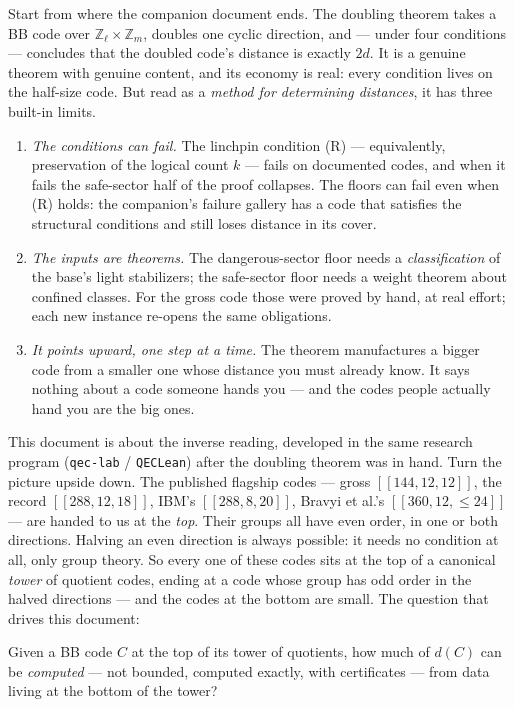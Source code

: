 \documentclass[11pt]{article}
\theoremstyle{plain}
\theoremstyle{definition}
\theoremstyle{remark}
\newcommand{\Z}{\mathbb{Z}}
\begin{document}
Start from where the companion document ends. The doubling theorem takes a
BB code over $\Z_\ell \times \Z_m$, doubles one cyclic direction, and ---
under four conditions --- concludes that the doubled code's distance is
exactly $2d$. It is a genuine theorem with genuine content, and its
economy is real: every condition lives on the half-size code. But read as
a \emph{method for determining distances}, it has three built-in limits.

\begin{enumerate}[leftmargin=2.2em]
\item \emph{The conditions can fail.} The linchpin condition (R) ---
  equivalently, preservation of the logical count $k$ --- fails on
  documented codes, and when it fails the safe-sector half of the proof
  collapses. The floors can fail even when (R) holds: the companion's
  failure gallery has a code that satisfies the structural conditions and
  still loses distance in its cover.
\item \emph{The inputs are theorems.} The dangerous-sector floor needs a
  \emph{classification} of the base's light stabilizers; the safe-sector
  floor needs a weight theorem about confined classes. For the gross code
  those were proved by hand, at real effort; each new instance re-opens
  the same obligations.
\item \emph{It points upward, one step at a time.} The theorem
  manufactures a bigger code from a smaller one whose distance you must
  already know. It says nothing about a code someone hands you --- and the
  codes people actually hand you are the big ones.
\end{enumerate}

This document is about the inverse reading, developed in the same research
program (\texttt{qec-lab} / \texttt{QECLean}) after the doubling theorem
was in hand. Turn the picture upside down. The published flagship codes
--- gross $[[144,12,12]]$, the record $[[288,12,18]]$, IBM's
$[[288,8,20]]$, Bravyi et al.'s $[[360,12,\leq 24]]$ --- are handed to us
at the \emph{top}. Their groups all have even order, in one or both
directions. Halving an even direction is always possible: it needs no
condition at all, only group theory. So every one of these codes sits at
the top of a canonical \emph{tower} of quotient codes, ending at a code
whose group has odd order in the halved directions --- and the codes at
the bottom are small. The question that drives this document:

\begin{keyidea}
Given a BB code $C$ at the top of its tower of quotients, how much of
$d(C)$ can be \emph{computed} --- not bounded, computed exactly, with
certificates --- from data living at the bottom of the tower?
\end{keyidea}
\end{document}
